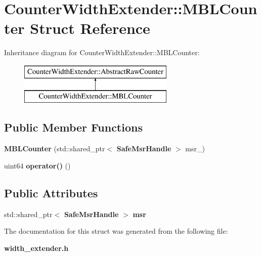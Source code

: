 \section{Counter\+Width\+Extender\+:\+:M\+B\+L\+Counter Struct Reference}
\label{structCounterWidthExtender_1_1MBLCounter}
Inheritance diagram for Counter\+Width\+Extender\+:\+:M\+B\+L\+Counter\+:\begin{figure}[H]
\begin{center}
\leavevmode
\includegraphics[height=2.000000cm]{structCounterWidthExtender_1_1MBLCounter}
\end{center}
\end{figure}
\subsection*{Public Member Functions}
\begin{DoxyCompactItemize}
\item 
{\bfseries M\+B\+L\+Counter} (std\+::shared\+\_\+ptr$<$ {\bf Safe\+Msr\+Handle} $>$ msr\+\_\+)\label{structCounterWidthExtender_1_1MBLCounter_ac13b8a75a9f0e948d105f4d4b0039c96}

\item 
uint64 {\bfseries operator()} ()\label{structCounterWidthExtender_1_1MBLCounter_a59d60249fca8c0ebbfda0fb907a8541b}

\end{DoxyCompactItemize}
\subsection*{Public Attributes}
\begin{DoxyCompactItemize}
\item 
std\+::shared\+\_\+ptr$<$ {\bf Safe\+Msr\+Handle} $>$ {\bfseries msr}\label{structCounterWidthExtender_1_1MBLCounter_a59be96131241a483193530c52258ad00}

\end{DoxyCompactItemize}


The documentation for this struct was generated from the following file\+:\begin{DoxyCompactItemize}
\item 
{\bf width\+\_\+extender.\+h}\end{DoxyCompactItemize}
